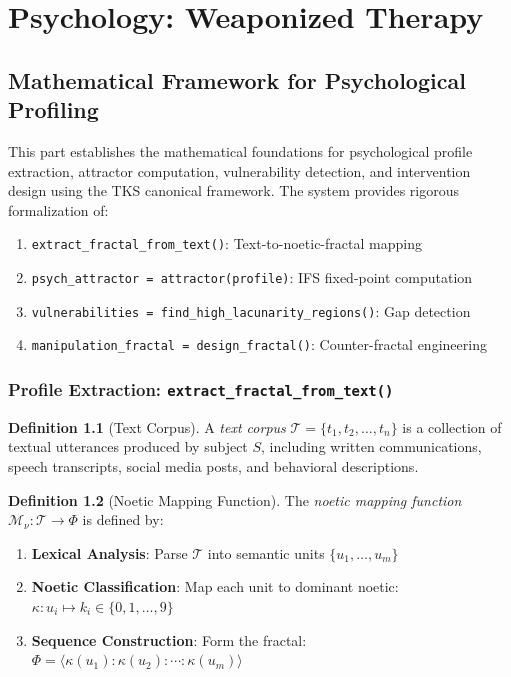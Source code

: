 \documentclass[11pt,twoside]{book}
\newcommand{\Frac}{\Phi}
\newcommand{\ProfileFrac}{\Phi}
\newcommand{\TextCorpus}{\mathcal{T}}
\newcommand{\NoetMap}{\mathcal{M}_\nu}
\theoremstyle{definition}
\newtheorem{definition}{Definition}[chapter]
\theoremstyle{plain}
\theoremstyle{remark}
\begin{document}
\part{Psychology: Weaponized Therapy}

\chapter{Mathematical Framework for Psychological Profiling}
\label{ch:psychological-profiling}

\begin{tcolorbox}[colback=blue!5!white,colframe=blue!75!black,title=\textbf{Purpose and Scope},breakable]
This part establishes the mathematical foundations for psychological profile extraction, attractor computation, vulnerability detection, and intervention design using the TKS canonical framework. The system provides rigorous formalization of:
\begin{enumerate}
    \item \texttt{extract\_fractal\_from\_text()}: Text-to-noetic-fractal mapping
    \item \texttt{psych\_attractor = attractor(profile)}: IFS fixed-point computation
    \item \texttt{vulnerabilities = find\_high\_lacunarity\_regions()}: Gap detection
    \item \texttt{manipulation\_fractal = design\_fractal()}: Counter-fractal engineering
\end{enumerate}
\end{tcolorbox}

\section{Profile Extraction: \texttt{extract\_fractal\_from\_text()}}

\begin{definition}[Text Corpus]
A \emph{text corpus} $\TextCorpus = \{t_1, t_2, \ldots, t_n\}$ is a collection of textual utterances produced by subject $S$, including written communications, speech transcripts, social media posts, and behavioral descriptions.
\end{definition}

\begin{definition}[Noetic Mapping Function]
The \emph{noetic mapping function} $\NoetMap : \TextCorpus \to \Frac$ is defined by:
\begin{enumerate}[label=(\roman*)]
    \item \textbf{Lexical Analysis}: Parse $\TextCorpus$ into semantic units $\{u_1, \ldots, u_m\}$
    \item \textbf{Noetic Classification}: Map each unit to dominant noetic: $\kappa : u_i \mapsto k_i \in \{0, 1, \ldots, 9\}$
    \item \textbf{Sequence Construction}: Form the fractal: $\ProfileFrac = \langle \kappa(u_1) : \kappa(u_2) : \cdots : \kappa(u_m) \rangle$
\end{enumerate}
\end{definition}
\end{document}
